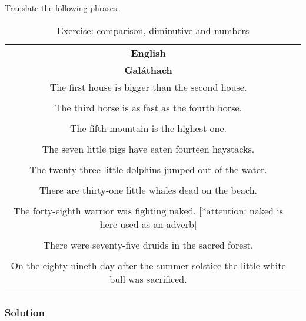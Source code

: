 Translate the following phrases.


\begin{table}[H]
\centering
\begin{tabular}{|c|M{5.0cm}|}
  \toprule
  \textbf{English}\\
  \textbf{Gal\'{a}thach}\\
  \toprule
  The first house is bigger than the second house.\\
  \\
  \midrule
  The third horse is as fast as the fourth horse.\\
  \\
  \midrule
  The fifth mountain is the highest one.\\
  \\
  \midrule
  The seven little pigs have eaten fourteen haystacks.\\
  \\
  \midrule
  The twenty-three little dolphins jumped out of the water.\\
  \\
  \midrule
  There are thirty-one little whales dead on the beach.\\
  \\
  \midrule
  The forty-eighth warrior was fighting naked. [*attention: naked is here used as an adverb]\\
  \\
  \midrule
  There were seventy-five druids in the sacred forest.\\
  \\
  \midrule
  On the eighty-nineth day after the summer solstice the little white bull was sacrificed.\\
  \\
  \bottomrule
\end{tabular}
\label{exercise_comparison_diminutive_numbers}
\caption{Exercise: comparison, diminutive and numbers}
\end{table}

\newpage
\subsubsection{Solution}

